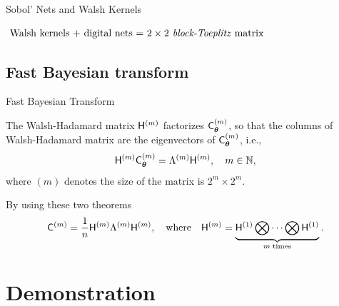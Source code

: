\documentclass[handout, 10pt,compress,xcolor={usenames,dvipsnames}]{beamer} %
\newcommand{\bm}[1]{\boldsymbol{#1}}
\renewcommand{\mLambda}{\Lambda}
\renewcommand{\vtheta}{{\bm{\theta}}}
\newcommand{\redroundmathbox}[1]{\parbox{\widthof{$#1$\hspace{1em}}}
	{\begin{mdframed}[style=redshade]\centering $#1$ \end{mdframed}}}
\begin{document}
\begin{frame}{Sobol' Nets and Walsh Kernels}
	

	\centering\redroundmathbox{\text{
			Walsh kernels + digital nets = \emph{$2\times 2$ block-Toeplitz} matrix
	}}
	
\end{frame}




\subsection{Fast Bayesian transform}


\begin{frame}{Fast Bayesian Transform}
	
	
	\begin{theorem}
		\label{thrm:hadamard_eigenvector}
		The Walsh-Hadamard matrix $\mathsf{H}^{(m)}$ factorizes $\mC_{\vtheta}^{(m)}$, so that the columns of Walsh-Hadamard matrix are the eigenvectors of $\mC_{\vtheta}^{(m)}$, i.e.,
		\vspace{-2ex}
		\begin{align*}
		\mH^{(m)} \mC_{\vtheta}^{(m)}  = \mLambda^{(m)} \mH^{(m)}, \quad m \in \naturals, 
		\end{align*}
		where $(m)$ denotes the size of the matrix is $2^m \times 2^m$.
	\end{theorem}

	By using these two theorems
	\begin{align}
	\label{eqn:hadamard_fwht}
	\mC^{(m)} = \frac{1}{n} \mH^{(m)} \mLambda^{(m)} \mH^{(m)}, \quad \text{where} \quad \mH^{({m})} = \underbrace{ \mH^{(1)} \bigotimes \cdots \bigotimes \mH^{(1)} }_{m \; \text{times}}.
	\end{align}
\end{frame}















\section{Demonstration}
\end{document}
